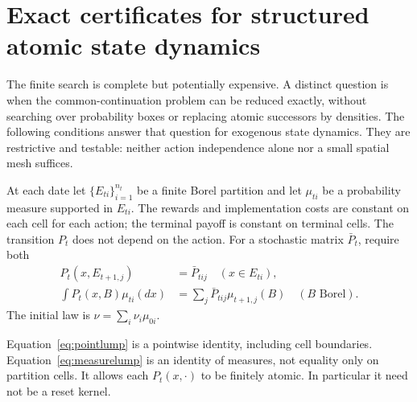\section{Exact certificates for structured atomic state dynamics}\label{sec:atomic}
The finite search is complete but potentially expensive. A distinct question is when the common-continuation problem can be reduced exactly, without searching over probability boxes or replacing atomic successors by densities. The following conditions answer that question for exogenous state dynamics. They are restrictive and testable: neither action independence alone nor a small spatial mesh suffices.

\begin{assumption}\label{ass:exogenous}
At each date let $\{E_{ti}\}_{i=1}^{n_t}$ be a finite Borel partition and let $\mu_{ti}$ be a probability measure supported in $E_{ti}$. The rewards and implementation costs are constant on each cell for each action; the terminal payoff is constant on terminal cells. The transition $P_t$ does not depend on the action. For a stochastic matrix $\bar P_t$, require both
\begin{align}
 P_t(x,E_{t+1,j})&=\bar P_{tij} \quad(x\in E_{ti}),\label{eq:pointlump}\\
 \int P_t(x,B)\mu_{ti}(dx)&=\sum_j\bar P_{tij}\mu_{t+1,j}(B)
       \quad(B\text{ Borel}).\label{eq:measurelump}
\end{align}
The initial law is $\nu=\sum_i\nu_i\mu_{0i}$.
\end{assumption}
Equation~\eqref{eq:pointlump} is a pointwise identity, including cell boundaries. Equation~\eqref{eq:measurelump} is an identity of measures, not equality only on partition cells. It allows each $P_t(x,\cdot)$ to be finitely atomic. In particular it need not be a reset kernel.

